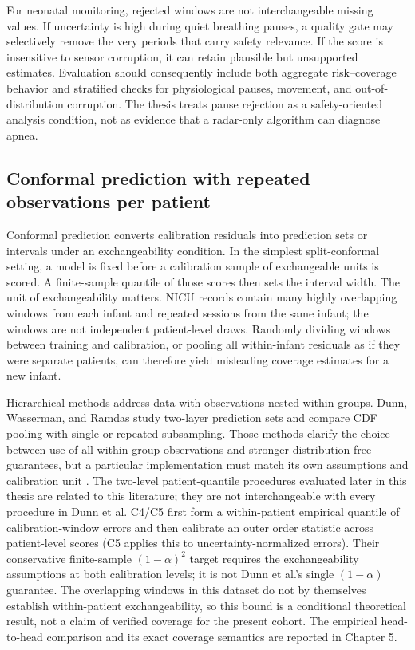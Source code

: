 For neonatal monitoring, rejected windows are not interchangeable missing values. If uncertainty
is high during quiet breathing pauses, a quality gate may selectively remove the very periods that
carry safety relevance. If the score is insensitive to sensor corruption, it can retain plausible
but unsupported estimates. Evaluation should consequently include both aggregate risk--coverage
behavior and stratified checks for physiological pauses, movement, and out-of-distribution
corruption. The thesis treats pause rejection as a safety-oriented analysis condition, not as
evidence that a radar-only algorithm can diagnose apnea.

\subsection{Conformal prediction with repeated observations per patient}

Conformal prediction converts calibration residuals into prediction sets or intervals under an
exchangeability condition. In the simplest split-conformal setting, a model is fixed before a
calibration sample of exchangeable units is scored. A finite-sample quantile of those scores then
sets the interval width. The unit of exchangeability matters. NICU records contain many highly
overlapping windows from each infant and repeated sessions from the same infant; the windows are
not independent patient-level draws. Randomly dividing windows between training and calibration,
or pooling all within-infant residuals as if they were separate patients, can therefore yield
misleading coverage estimates for a new infant.

Hierarchical methods address data with observations nested within groups. Dunn, Wasserman, and
Ramdas study two-layer prediction sets and compare CDF pooling with single or repeated subsampling.
Those methods clarify the choice between use of all within-group observations and stronger
distribution-free guarantees, but a particular implementation must match its own assumptions and
calibration unit \citep{dunn2023distribution}. The two-level patient-quantile procedures evaluated
later in this thesis are related to this literature; they are not interchangeable with every
procedure in Dunn et al. C4/C5 first form a within-patient empirical quantile of calibration-window
errors and then calibrate an outer order statistic across patient-level scores (C5 applies this to
uncertainty-normalized errors). Their conservative finite-sample $(1-\alpha)^2$ target requires the
exchangeability assumptions at both calibration levels; it is not Dunn et al.'s single
$(1-\alpha)$ guarantee. The overlapping windows in this dataset do not by themselves establish
within-patient exchangeability, so this bound is a conditional theoretical result, not a claim of
verified coverage for the present cohort. The empirical head-to-head comparison and its exact
coverage semantics are reported in Chapter 5.

